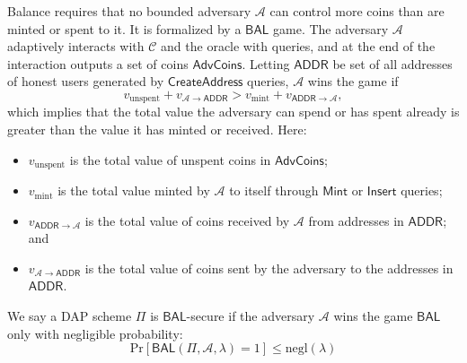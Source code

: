 \documentclass{llncs}
\newcommand{\func}[1]{\mathsf{#1}}
\begin{document}
Balance requires that no bounded adversary $\mathcal{A}$ can control more coins than are minted or spent to it.
It is formalized by a $\func{BAL}$ game.
The adversary $\mathcal{A}$ adaptively interacts with $\mathcal{C}$ and the oracle with queries, and at the end of the interaction outputs a set of coins $\func{AdvCoins}$.
Letting $\func{ADDR}$ be set of all addresses of honest users generated by $\func{CreateAddress}$ queries, $\mathcal{A}$ wins the game if
$$v_{\text{unspent}} + v_{\mathcal{A} \to \func{ADDR}} > v_{\text{mint}} + v_{\func{ADDR} \to \mathcal{A}},$$
which implies that the total value the adversary can spend or has spent already is greater than the value it has minted or received.
Here:
\begin{itemize}
    \item $v_{\text{unspent}}$ is the total value of unspent coins in $\func{AdvCoins}$;
    \item $v_{\text{mint}}$ is the total value minted by $\mathcal{A}$ to itself through $\func{Mint}$ or $\func{Insert}$ queries;
    \item $v_{\func{ADDR} \xrightarrow{} \mathcal{A}}$ is the total value of coins received by $\mathcal{A}$ from addresses in $\func{ADDR}$; and
    \item $v_{\mathcal{A} \xrightarrow{} \func{ADDR}}$ is the total value of coins sent by the adversary to the addresses in $\func{ADDR}$.
\end{itemize}
We say a DAP scheme $\Pi$ is $\func{BAL}$-secure if the adversary $\mathcal{A}$ wins the game $\func{BAL}$ only with negligible probability:
$$\text{Pr}[\func{BAL}(\Pi, \mathcal{A}, \lambda) = 1] \leq \text{negl}(\lambda)$$
\end{document}
